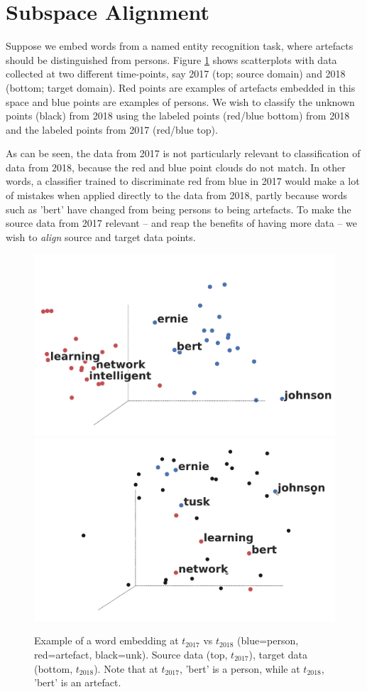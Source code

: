 \documentclass[letterpaper]{article} %
\begin{document}

\section{Subspace Alignment}
Suppose we embed words from a named entity recognition task, where {\sc artefact}s should be distinguished from {\sc person}s. Figure \ref{fig:2DG} shows scatterplots with data collected at two different time-points, say 2017 (top; source domain) and 2018 (bottom; target domain). Red points are examples of {\sc artefact}s  embedded in this space and blue points are examples of {\sc person}s. We wish to classify the unknown points (black) from 2018 using the labeled points (red/blue bottom) from 2018 and the labeled points from 2017 (red/blue top).

As can be seen, the data from 2017 is not particularly relevant to classification of data from 2018, because the red and blue point clouds do not match. In other words, a classifier trained to discriminate red from blue in 2017 would make a lot of mistakes when applied directly to the data from 2018, partly because words such as 'bert' have changed from being {\sc person}s to being {\sc artefact}s. %
To make the source data from 2017 relevant -- and reap the benefits of having more data -- we wish to \emph{align} source and target data points.
\begin{figure}[!t]
    \centering
    \includegraphics[width=.44\textwidth]{2DG_problem-setting-src_annotated.pdf}
    \includegraphics[width=.44\textwidth]{2DG_problem-setting-tgt_annotated.pdf}
    \caption{Example of a word embedding at $t_{2017}$ vs $t_{2018}$ (blue={\sc person}, red={\sc artefact}, black={\sc unk}). Source data (top, $t_{2017}$), target data (bottom, $t_{2018}$). Note that at $t_{2017}$, 'bert' is a {\sc person}, while at $t_{2018}$, 'bert' is an {\sc artefact}.}
    \label{fig:2DG}
\end{figure}
\end{document}
